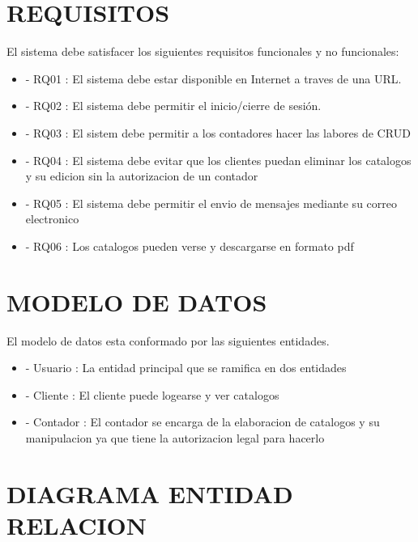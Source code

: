 \documentclass{article}
\begin{document}
\section{REQUISITOS}

El sistema debe satisfacer los siguientes requisitos funcionales y no funcionales:

\begin{itemize}
\item - RQ01 : El sistema debe estar disponible en Internet a traves de una URL.
\item - RQ02 : El sistema debe permitir el inicio/cierre de sesión.
\item - RQ03 : El sistem debe permitir a los contadores hacer las labores de CRUD
\item - RQ04 : El sistema debe evitar que los clientes puedan eliminar los catalogos y su edicion sin la autorizacion de un contador   
\item - RQ05 : El sistema debe permitir el envio de mensajes mediante su correo electronico  
\item - RQ06 : Los catalogos pueden verse y descargarse en formato pdf 
\end{itemize}

\section{MODELO DE DATOS}
El modelo de datos esta conformado por las siguientes entidades.

\begin{itemize}
\item - Usuario : La entidad principal que se ramifica en dos entidades
\item - Cliente : El cliente puede logearse y ver catalogos
\item - Contador : El contador se encarga de la elaboracion de catalogos y su manipulacion ya que tiene la autorizacion legal para hacerlo
\end{itemize}
\newpage


\section{DIAGRAMA ENTIDAD RELACION}
\end{document}

